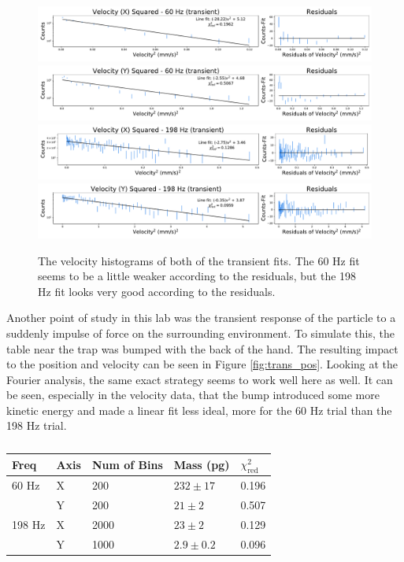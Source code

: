\documentclass[12pt]{article}
\begin{document}
\begin{figure}[!ht]
\centering\
    \includegraphics[width=\textwidth]{data_02_x_vel.pdf}
    \includegraphics[width=\textwidth]{data_02_y_vel.pdf}
    \includegraphics[width=\textwidth]{data_05_x_vel.pdf}
    \includegraphics[width=\textwidth]{data_05_y_vel.pdf}
	\caption{The velocity histograms of both of the transient fits. The 60 Hz fit seems to be a little weaker according to the residuals, but the 198 Hz fit looks very good according to the residuals.}
    \label{fig:trans_vel}
\end{figure}

Another point of study in this lab was the transient response of the particle to a suddenly impulse of force on the surrounding environment. To simulate this, the table near the trap was bumped with the back of the hand. The resulting impact to the position and velocity can be seen in Figure \ref{fig:trans_pos}. Looking at the Fourier analysis, the same exact strategy seems to work well here as well. It can be seen, especially in the velocity data, that the bump introduced some more kinetic energy and made a linear fit less ideal, more for the 60 Hz trial than the 198 Hz trial. 

\begin{table}[ht]
\caption{}
\label{tab:trans_masses}
\centering
\begin{tabular}{lllll}
Freq   & Axis & Num of Bins & Mass (pg)     & $\chi_\text{red}^2$ \\ \hline
60 Hz  & X    & 200         & $232 \pm  17$ & 0.196               \\
       & Y    & 200         & $21 \pm 2$    & 0.507               \\
198 Hz & X    & 2000        & $23 \pm 2$    & 0.129               \\
       & Y    & 1000        & $2.9 \pm 0.2$ & 0.096              
\end{tabular}
\end{table}
\end{document}
